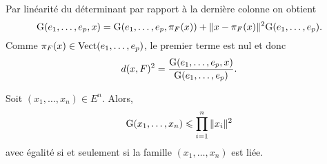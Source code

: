 \begin{preuve}
    Par linéarité du déterminant par rapport à la dernière colonne \note on obtient
    $$\mathrm{G}(e_1, \dots, e_p, x) = \mathrm{G}(e_1, \dots, e_p, \pi_F(x)) + \Vert x - \pi_F(x) \Vert^2 \mathrm{G}(e_1, \dots, e_p).$$
    Comme $\pi_F(x) \in \mathrm{Vect}(e_1, \dots, e_p)$, le premier terme est nul et donc 
    $$d(x, F)^2 = \frac{\mathrm{G}(e_1, \dots, e_p, x)}{\mathrm{G}(e_1, \dots, e_p)}.$$
\end{preuve}

\begin{corol} \label{inegalite_gram}
    Soit $(x_1, \dots, x_n) \in E^n$. Alors,
    $$\mathrm{G}(x_1, \dots, x_n) \leqslant \prod_{i=1}^n \Vert x_i \Vert^2$$
    avec égalité si et seulement si la famille $(x_1, \dots, x_n)$ est liée. 
\end{corol}

